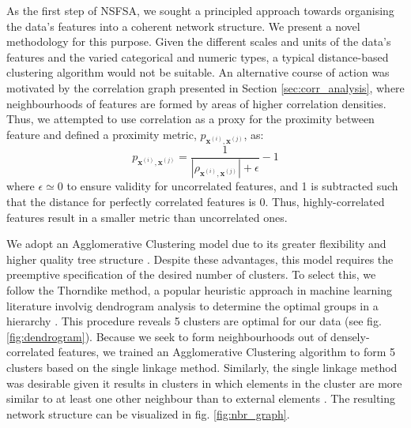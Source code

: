 \documentclass{article}
\begin{document}
As the first step of NSFSA, we sought a principled approach towards organising the data's features into a coherent network structure. We present a novel methodology for this purpose. Given the different scales and units of the data's features and the varied categorical and numeric types, a typical distance-based clustering algorithm would not be suitable. An alternative course of action was motivated by the correlation graph presented in Section \ref{sec:corr_analysis}, where neighbourhoods of features are formed by areas of higher correlation densities. Thus, we attempted to use correlation as a proxy for the proximity between feature and defined a proximity metric, $p_{\mathbf{x}^{(i)}, \mathbf{x}^{(j)}}$, as:
\begin{equation}
	p_{\mathbf{x}^{(i)}, \mathbf{x}^{(j)}} = \frac{1}{|\rho_{\mathbf{x}^{(i)}, \mathbf{x}^{(j)}}| + \epsilon} -1 
\end{equation}
where $\epsilon \simeq 0$ to ensure validity for uncorrelated features, and 1 is subtracted such that the distance for perfectly correlated features is 0. Thus, highly-correlated features result in a smaller metric than uncorrelated ones.

We adopt an Agglomerative Clustering model due to its greater flexibility and higher quality tree structure \citep{walter2008fast}. Despite these advantages, this model requires the preemptive specification of the desired number of clusters. To select this, we follow the Thorndike method, a popular heuristic approach in machine learning literature involvig dendrogram analysis to determine the optimal groups in a hierarchy \citep{thorndike1953belongs}. This procedure reveals 5 clusters are optimal for our data (see fig. \ref{fig:dendrogram}). Because we seek to form neighbourhoods out of densely-correlated features, we trained an Agglomerative Clustering algorithm to form 5 clusters based on the single linkage method. Similarly, the single linkage method was desirable given it results in clusters in which elements in the cluster are more similar to at least one other neighbour than to external elements \citep{el1989comparison}. The resulting network structure can be visualized in fig. \ref{fig:nbr_graph}.
\end{document}
